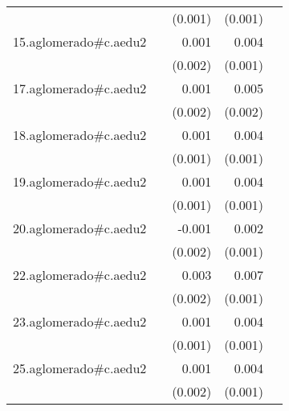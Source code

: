 {\begin{longtable}{l*{4}{D{.}{.}{-1}}}
            &                     &     (0.001)         &     (0.001)         &                     \\
\addlinespace
15.aglomerado#c.aedu2&                     &       0.001         &       0.004\sym{***}&                     \\
            &                     &     (0.002)         &     (0.001)         &                     \\
\addlinespace
17.aglomerado#c.aedu2&                     &       0.001         &       0.005\sym{**} &                     \\
            &                     &     (0.002)         &     (0.002)         &                     \\
\addlinespace
18.aglomerado#c.aedu2&                     &       0.001         &       0.004\sym{***}&                     \\
            &                     &     (0.001)         &     (0.001)         &                     \\
\addlinespace
19.aglomerado#c.aedu2&                     &       0.001         &       0.004\sym{***}&                     \\
            &                     &     (0.001)         &     (0.001)         &                     \\
\addlinespace
20.aglomerado#c.aedu2&                     &      -0.001         &       0.002         &                     \\
            &                     &     (0.002)         &     (0.001)         &                     \\
\addlinespace
22.aglomerado#c.aedu2&                     &       0.003\sym{*}  &       0.007\sym{***}&                     \\
            &                     &     (0.002)         &     (0.001)         &                     \\
\addlinespace
23.aglomerado#c.aedu2&                     &       0.001         &       0.004\sym{***}&                     \\
            &                     &     (0.001)         &     (0.001)         &                     \\
\addlinespace
25.aglomerado#c.aedu2&                     &       0.001         &       0.004\sym{**} &                     \\
            &                     &     (0.002)         &     (0.001)         &                     \\

\end{longtable}}
